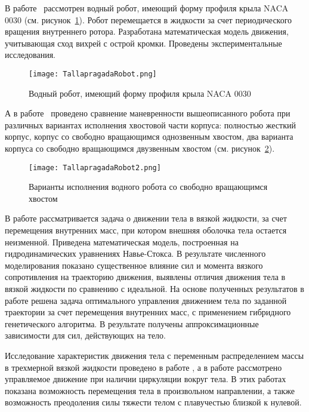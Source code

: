 В работе~\cite{Tallapragada_2015} рассмотрен водный робот, имеющий форму профиля крыла NACA 0030 (см. рисунок~\ref{TallapragadaRobot}). Робот перемещается в жидкости за счет периодического вращения внутреннего ротора. Разработана математическая модель движения, учитывающая сход вихрей с острой кромки. Проведены экспериментальные исследования. 

\begin{figure}[h]
	\centering
	\texttt{[image: TallapragadaRobot.png]}%
	\caption{Водный робот, имеющий форму профиля крыла NACA 0030}
	\label{TallapragadaRobot}
\end{figure}

А в работе~\cite{Pollard_Tallapragada_2019} проведено сравнение маневренности вышеописанного робота при различных вариантах исполнения хвостовой части корпуса: полностью жесткий корпус, корпус со свободно вращающимся однозвенным хвостом, два варианта корпуса со свободно вращающимся двузвенным хвостом (см. рисунок~\ref{TallapragadaRobot2}).

\begin{figure}[h]
	\centering
	\texttt{[image: TallapragadaRobot2.png]}%
	\caption{Варианты исполнения водного робота со свободно вращающимся хвостом}
	\label{TallapragadaRobot2}
\end{figure}



В работе \cite{Ramodanov_Tenenev} рассматривается задача о движении тела в вязкой жидкости, за счет перемещения внутренних масс, при котором внешняя оболочка тела остается неизменной. Приведена математическая модель, построенная на гидродинамических уравнениях Навье-Стокса. В результате численного моделирования показано существенное влияние сил и момента вязкого сопротивления на траекторию движения, выявлены отличия движения тела в вязкой жидкости по сравнению с идеальной. На основе полученных результатов в работе \cite{Vetchanin_Tenenev_2011} решена задача оптимального управления движением тела по заданной траектории за счет перемещения внутренних масс, с применением гибридного генетического алгоритма. В результате получены аппроксимационные зависимости для сил, действующих на тело.

Исследование характеристик движения тела с переменным распределением массы в трехмерной вязкой жидкости проведено в работе \cite{Vetchanin_Mamaev_Tenenev_ND_2012}, а в работе \cite{Kilin_Vetchanin_DAN_2016} рассмотрено управляемое движение при наличии циркуляции вокруг тела. В этих работах показана возможность перемещения тела в произвольном направлении, а также возможность преодоления силы тяжести телом с плавучестью близкой к нулевой.





